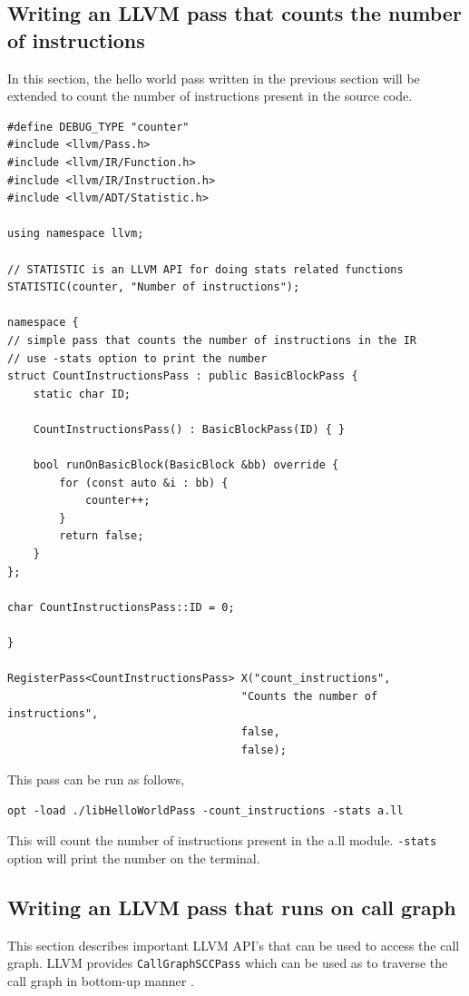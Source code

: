 \documentclass[a4paper,12pt]{report}
\begin{document}
\subsection{Writing an LLVM pass that counts the number of instructions}
In this section, the hello world pass written in the previous section will be extended
to count the number of instructions present in the source code.

\begin{verbatim}
#define DEBUG_TYPE "counter"
#include <llvm/Pass.h>
#include <llvm/IR/Function.h>
#include <llvm/IR/Instruction.h>
#include <llvm/ADT/Statistic.h>

using namespace llvm;

// STATISTIC is an LLVM API for doing stats related functions
STATISTIC(counter, "Number of instructions");

namespace {
// simple pass that counts the number of instructions in the IR
// use -stats option to print the number
struct CountInstructionsPass : public BasicBlockPass {
    static char ID;

    CountInstructionsPass() : BasicBlockPass(ID) { }

    bool runOnBasicBlock(BasicBlock &bb) override {
        for (const auto &i : bb) {
            counter++;
        }
        return false;
    }
};

char CountInstructionsPass::ID = 0;

}

RegisterPass<CountInstructionsPass> X("count_instructions",
                                    "Counts the number of instructions",
                                    false,
                                    false);

\end{verbatim}

This pass can be run as follows,

\begin{verbatim}
opt -load ./libHelloWorldPass -count_instructions -stats a.ll
\end{verbatim}

This will count the number of instructions present in the a.ll module. \texttt{-stats} option
will print the number on the terminal.

\subsection{Writing an LLVM pass that runs on call graph}
This section describes important LLVM API's that can be used to access the call graph.
LLVM provides \texttt{CallGraphSCCPass} which can be used as to traverse the call graph
in bottom-up manner \cite{llvm-call-graph}.
\end{document}
